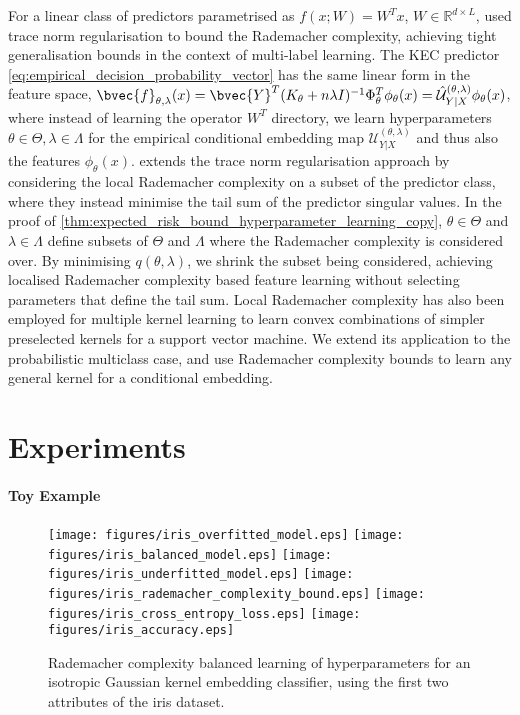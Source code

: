 \documentclass{article}
\begin{document}
	For a linear class of predictors parametrised as $f(x; W) = W^{T} x$, $W \in \mathbb{R}^{d \times L}$, \cite{yu2014large} used trace norm regularisation to bound the Rademacher complexity, achieving tight generalisation bounds in the context of multi-label learning. The KEC predictor \eqref{eq:empirical_decision_probability_vector} has the same linear form in the feature space, $\bvec{f}_{\theta, \lambda}(x) = \bvec{Y}^{T} (K_{\theta} + n \lambda I)^{-1} \Phi_{\theta}^{T} \phi_{\theta}(x) = \hat{\mathcal{U}}^{(\theta, \lambda)}_{Y | X} \phi_{\theta}(x)$, where instead of learning the operator $W^{T}$ directory, we learn hyperparameters $\theta \in \Theta, \lambda \in \Lambda$ for the empirical conditional embedding map $\mathcal{U}^{(\theta, \lambda)}_{Y | X}$ and thus also the features $\phi_{\theta}(x)$. \cite{xu2016local} extends the trace norm regularisation approach by considering the local Rademacher complexity on a subset of the predictor class, where they instead minimise the tail sum of the predictor singular values. In the proof of \cref{thm:expected_risk_bound_hyperparameter_learning_copy}, $\theta \in \Theta$ and $\lambda \in \Lambda$ define subsets of $\Theta$ and $\Lambda$ where the Rademacher complexity is considered over. By minimising $q(\theta, \lambda)$, we shrink the subset being considered, achieving localised Rademacher complexity based feature learning without selecting parameters that define the tail sum. Local Rademacher complexity has also been employed for multiple kernel learning \citep{kloft2011local, cortes2013learning} to learn convex combinations of simpler preselected kernels for a support vector machine. We extend its application to the probabilistic multiclass case, and use Rademacher complexity bounds to learn any general kernel for a conditional embedding.

\section{Experiments}
\label{sec:experiments}

	\paragraph{Toy Example}
	
		\begin{figure}[t]
			\centering
			\texttt{[image: figures/iris\_overfitted\_model.eps]}
			\texttt{[image: figures/iris\_balanced\_model.eps]}
			\texttt{[image: figures/iris\_underfitted\_model.eps]}
			\texttt{[image: figures/iris\_rademacher\_complexity\_bound.eps]}
			\texttt{[image: figures/iris\_cross\_entropy\_loss.eps]}
			\texttt{[image: figures/iris\_accuracy.eps]}
			\caption{Rademacher complexity balanced learning of hyperparameters for an isotropic Gaussian kernel embedding classifier, using the first two attributes of the iris dataset.}
			\label{fig:iris}
		\end{figure}
		
\end{document}
